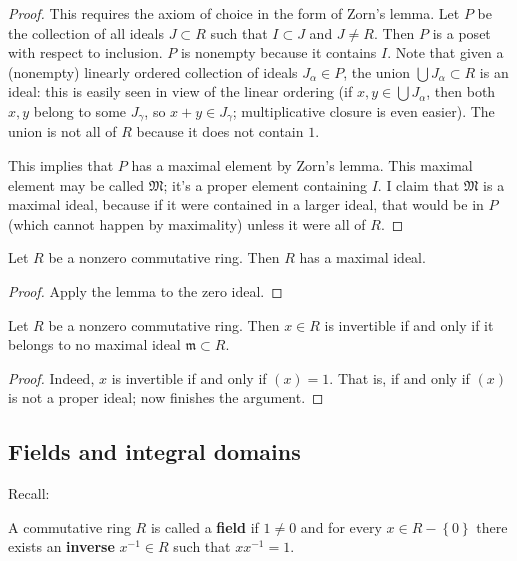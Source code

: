 \begin{proof} 
This requires the axiom of choice in the form of Zorn's lemma.  Let
$P$ be the collection of all ideals $J \subset R$ such that $I
\subset J$ and $J \neq R$.  Then $P$ is a poset with respect to  inclusion.  $P$ is
nonempty because it contains $I$.  Note that given a (nonempty) linearly ordered
collection of ideals $J_{\alpha} \in P$, the union $\bigcup J_{\alpha} \subset
R$ is an ideal: this is easily seen in view of the linear ordering (if $x,y
\in \bigcup J_{\alpha}$, then both $x,y$ belong to some $J_{\gamma}$, so $x+y
\in J_{\gamma}$; multiplicative closure is even easier). The union is not all
of $R$ because it does not contain $1$.  

This implies that $P$ has a maximal element by Zorn's lemma.  This maximal element may
be called $\mathfrak{M}$; it's a proper element containing $I$. I claim that
$\mathfrak{M}$ is a maximal ideal, because if it were contained in a larger
 ideal, that would  be in $P$ (which cannot happen by maximality) unless it were all of $R$.
\end{proof} 

\begin{corollary} 
Let $R $ be a nonzero commutative ring.  Then $R$ has a maximal ideal.
\end{corollary} 
\begin{proof} 
Apply the lemma to the zero ideal.  
\end{proof} 

\begin{corollary} 
Let $R$ be a nonzero commutative ring. Then $x \in R$ is invertible if and
only if it belongs to no maximal ideal $\mathfrak{m} \subset R$.
\end{corollary} 
\begin{proof} 
Indeed, $x$ is invertible if and only if $(x) = 1$. That is, if and only if
$(x)$ is not a proper ideal; now 
finishes the argument.
\end{proof} 

\subsection{Fields and integral domains}

Recall:

\begin{definition} 
A commutative ring $R$ is called a  \textbf{field} if $1 \neq 0$ and for every $x \in R -
\left\{0\right\}$ there exists an \textbf{inverse} $x^{-1} \in R$ such that $xx^{-1} =
1$.


\end{definition}


